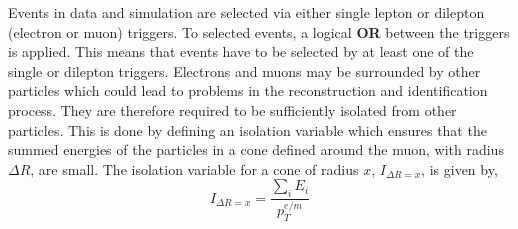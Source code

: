Events in data and simulation are selected via either single lepton or dilepton (electron or muon) triggers. To selected events, a logical \textbf{OR} between the triggers is applied. This means that events have to be selected by at least one of the single or dilepton triggers. Electrons and muons may be surrounded by other particles which could lead to problems in the reconstruction and identification process. They are therefore required to be sufficiently isolated from other particles. This is done by defining an isolation variable which ensures that the summed energies of the particles in a cone defined around the muon, with radius $\Delta R$, are small. The isolation variable for a cone of radius $x$, $I_{\Delta R = x}$, is given by,
\begin{equation}
I_{\Delta R = x} = \frac{\sum_{i} E_{i}}{p^{e/m}_{T}}
\end{equation}
